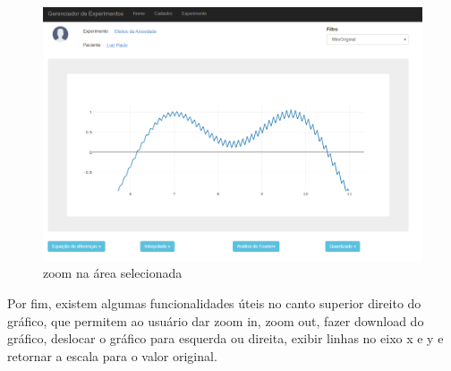 \begin{figure}[h!]
	\begin{center}
		\includegraphics[width=0.8\linewidth]{images/home_zoom_mouse2.png}
		\caption{zoom na área selecionada}
		\label{fig:home_zoom_mouse2}
	\end{center}
\end{figure}

Por fim, existem algumas funcionalidades úteis no canto superior direito do gráfico, que permitem ao usuário dar zoom in, zoom out, fazer download do gráfico, deslocar o gráfico para esquerda ou direita, exibir linhas no eixo x e y e retornar a escala para o valor original. 